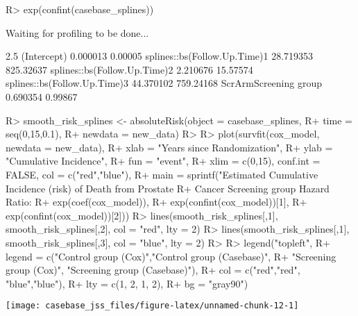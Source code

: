 \documentclass[article]{jss}
\begin{document}
\begin{CodeChunk}
\begin{CodeInput}
R> exp(confint(casebase_splines))
\end{CodeInput}

\begin{CodeOutput}
Waiting for profiling to be done...
\end{CodeOutput}

\begin{CodeOutput}
                                 2.5 %
(Intercept)                   0.000013   0.00005
splines::bs(Follow.Up.Time)1 28.719353 825.32637
splines::bs(Follow.Up.Time)2  2.210676  15.57574
splines::bs(Follow.Up.Time)3 44.370102 759.24168
ScrArmScreening group         0.690354   0.99867
\end{CodeOutput}
\end{CodeChunk}

\begin{CodeChunk}

\begin{CodeInput}
R> smooth_risk_splines <- absoluteRisk(object = casebase_splines, 
R+                                     time = seq(0,15,0.1), 
R+                                     newdata = new_data)
R> 
R> plot(survfit(cox_model, newdata = new_data),
R+      xlab = "Years since Randomization", 
R+      ylab = "Cumulative Incidence", 
R+      fun = "event",
R+      xlim = c(0,15), conf.int = FALSE, col = c("red","blue"), 
R+      main = sprintf("Estimated Cumulative Incidence (risk) of Death from Prostate 
R+                     Cancer Screening group Hazard Ratio: %
R+                     exp(coef(cox_model)), 
R+                     exp(confint(cox_model))[1], 
R+                     exp(confint(cox_model))[2]))
R> lines(smooth_risk_splines[,1], smooth_risk_splines[,2], col = "red", lty = 2)
R> lines(smooth_risk_splines[,1], smooth_risk_splines[,3], col = "blue", lty = 2)
R> 
R> legend("topleft", 
R+        legend = c("Control group (Cox)","Control group (Casebase)",
R+                   "Screening group (Cox)", "Screening group (Casebase)"), 
R+        col = c("red","red", "blue","blue"),
R+        lty = c(1, 2, 1, 2), 
R+        bg = "gray90")
\end{CodeInput}


\begin{center}\texttt{[image: casebase\_jss\_files/figure-latex/unnamed-chunk-12-1]} \end{center}

\end{CodeChunk}
\end{document}
